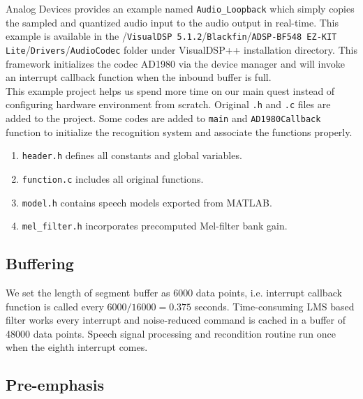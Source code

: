 Analog Devices provides an example named \texttt{Audio\_Loopback} which simply copies the sampled and quantized audio input to the audio output in real-time. This example is available in the /\texttt{VisualDSP 5.1.2}/\texttt{Blackfin}/\texttt{ADSP-BF548 EZ-KIT Lite}/\texttt{Drivers}/\texttt{AudioCodec} folder under VisualDSP++ installation directory. This framework initializes the codec AD1980 via the device manager and will invoke an interrupt callback function when the inbound buffer is full.\\

This example project helps us spend more time on our main quest instead of configuring hardware environment from scratch. Original \texttt{.h} and \texttt{.c} files are added to the project. Some codes are added to \texttt{main} and \texttt{AD1980Callback} function to initialize the recognition system and associate the functions properly.
\begin{enumerate}
\item \texttt{header.h} defines all constants and global variables.
\item \texttt{function.c} includes all original functions.
\item \texttt{model.h} contains speech models exported from MATLAB.
\item \texttt{mel\_filter.h} incorporates precomputed Mel-filter bank gain.
\end{enumerate}


\subsection{Buffering}

We set the length of segment buffer as 6000 data points, i.e. interrupt callback function is called every $6000 / 16000 = 0.375$ seconds. Time-consuming LMS based filter works every interrupt and noise-reduced command is cached in a buffer of 48000 data points. Speech signal processing and recondition routine run once when the eighth interrupt comes.


\subsection{Pre-emphasis}

